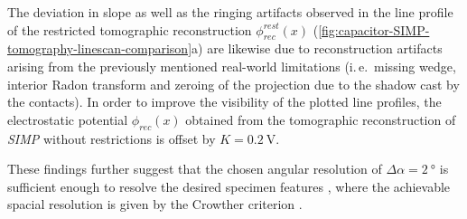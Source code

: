 The deviation in slope as well as the ringing artifacts observed in the line profile of the restricted tomographic reconstruction $\phi_{\mathit{rec}}^{\mathit{rest}}\left(x\right)$ (\cref{fig:capacitor-SIMP-tomography-linescan-comparison}a) are likewise due to reconstruction artifacts arising from the previously mentioned real-world limitations (i.\,e.\ missing wedge, interior Radon transform and zeroing of the projection due to the shadow cast by the contacts).
\newpage
In order to improve the visibility of the plotted line profiles, the electrostatic potential $\phi_{\mathit{rec}}\left(x\right)$ obtained from the tomographic reconstruction of \emph{SIMP} without restrictions is offset by $K = \SI{0.2}{\volt}$.

These findings further suggest that the chosen angular resolution of $\Delta \alpha = \SI{2}{\degree}$ is sufficient enough to resolve the desired specimen features \cite{Yalisove2021}, where the achievable spacial resolution is given by the Crowther criterion \cite{Bracewell1967,Crowther1970}.

